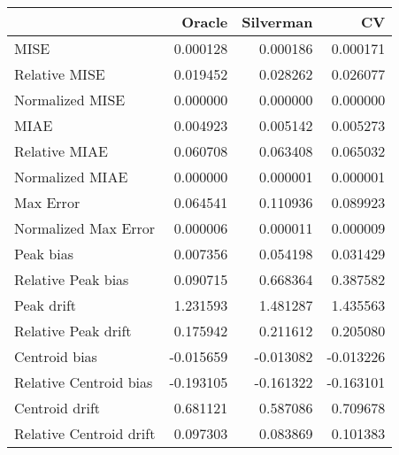 \begin{tabular}{lrrr}
  \hline
 & Oracle & Silverman & CV \\ 
  \hline
MISE & 0.000128 & 0.000186 & 0.000171 \\ 
  Relative MISE & 0.019452 & 0.028262 & 0.026077 \\ 
  Normalized MISE & 0.000000 & 0.000000 & 0.000000 \\ 
  MIAE & 0.004923 & 0.005142 & 0.005273 \\ 
  Relative MIAE & 0.060708 & 0.063408 & 0.065032 \\ 
  Normalized MIAE & 0.000000 & 0.000001 & 0.000001 \\ 
  Max Error & 0.064541 & 0.110936 & 0.089923 \\ 
  Normalized Max Error & 0.000006 & 0.000011 & 0.000009 \\ 
  Peak bias & 0.007356 & 0.054198 & 0.031429 \\ 
  Relative Peak bias & 0.090715 & 0.668364 & 0.387582 \\ 
  Peak drift & 1.231593 & 1.481287 & 1.435563 \\ 
  Relative Peak drift & 0.175942 & 0.211612 & 0.205080 \\ 
  Centroid bias & -0.015659 & -0.013082 & -0.013226 \\ 
  Relative Centroid bias & -0.193105 & -0.161322 & -0.163101 \\ 
  Centroid drift & 0.681121 & 0.587086 & 0.709678 \\ 
  Relative Centroid drift & 0.097303 & 0.083869 & 0.101383 \\ 
   \hline
\end{tabular}
